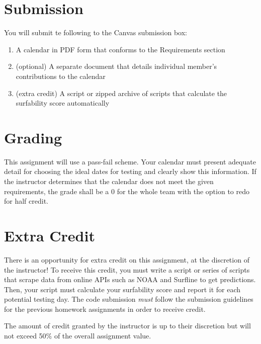 \documentclass[
	letterpaper, %
	fontsize=10pt, %
	twoside=true, %
	numbers=noenddot, %
]{kaobook}
\begin{document}
\pagebreak

\section*{Submission}
You will submit te following to the Canvas submission box:

\begin{enumerate}
	\item A calendar in PDF form that conforms to the Requirements section
	\item (optional) A separate document that details individual member's contributions to the calendar
	\item (extra credit) A script or zipped archive of scripts that calculate the surfability score automatically
\end{enumerate}


\section*{Grading}
This assignment will use a pass-fail scheme.
Your calendar must present adequate detail for choosing the ideal dates for testing and clearly show this information.
If the instructor determines that the calendar does not meet the given requirements, the grade shall be a 0 for the whole team with the option to redo for half credit.

\section*{Extra Credit}
There is an opportunity for extra credit on this assignment, at the discretion of the instructor!
To receive this credit, you must write a script or series of scripts that scrape data from online APIs such as NOAA and Surfline to get predictions.
Then, your script must calculate your surfability score and report it for each potential testing day.
The code submission \emph{must} follow the submission guidelines for the previous homework assignments in order to receive credit.

The amount of credit granted by the instructor is up to their discretion but will not exceed 50\% of the overall assignment value.
\end{document}
